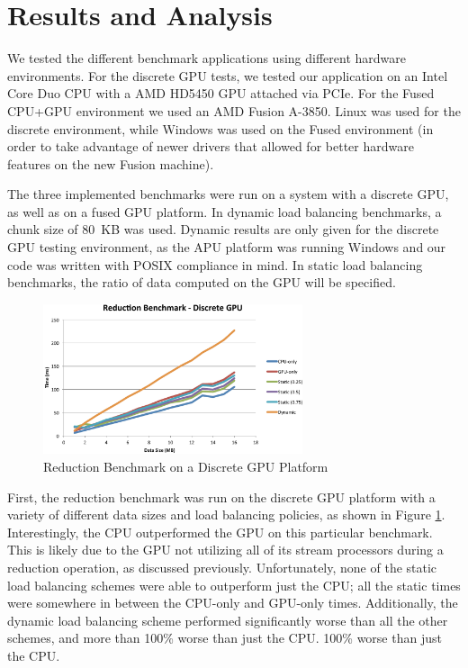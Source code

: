 \documentclass[journal]{IEEEtran}
\begin{document}
\section{Results and Analysis}
We tested the different benchmark applications using different hardware environments.
For the discrete GPU tests, we tested our application on an Intel Core Duo CPU with a
AMD HD5450 GPU attached via PCIe.  For the Fused CPU+GPU environment we used an AMD
Fusion A-3850.  Linux was used for the discrete environment, while Windows was used
on the Fused environment (in order to take advantage of newer drivers that allowed
for better hardware features on the new Fusion machine).  

The three implemented benchmarks were run on a system with a discrete GPU, as well as
on a fused GPU platform.  In dynamic load balancing benchmarks, a chunk size of 80~KB
was used.  Dynamic results are only given for the discrete GPU testing environment,
as the APU platform was running Windows and our code was written with POSIX compliance
in mind.  In static load balancing benchmarks, the ratio of data computed on the GPU
will be specified.

\begin{figure}[t]
\centering
\includegraphics[width=3.0in]{reduce_discrete}
\caption{Reduction Benchmark on a Discrete GPU Platform}
\label{fig:reduce_discrete}
\end{figure}

First, the reduction benchmark was run on the discrete GPU platform with a variety of
different data sizes and load balancing policies, as shown in Figure \ref{fig:reduce_discrete}.
Interestingly, the CPU outperformed the GPU on this particular benchmark.  This is likely
due to the GPU not utilizing all of its stream processors during a reduction operation, as
discussed previously.  Unfortunately, none of the static load balancing schemes were able
to outperform just the CPU; all the static times were somewhere in between the CPU-only and
GPU-only times.  Additionally, the dynamic load balancing scheme performed significantly
worse than all the other schemes, and more than 100\% worse than just the CPU.
100\% worse than just the CPU.
\end{document}
